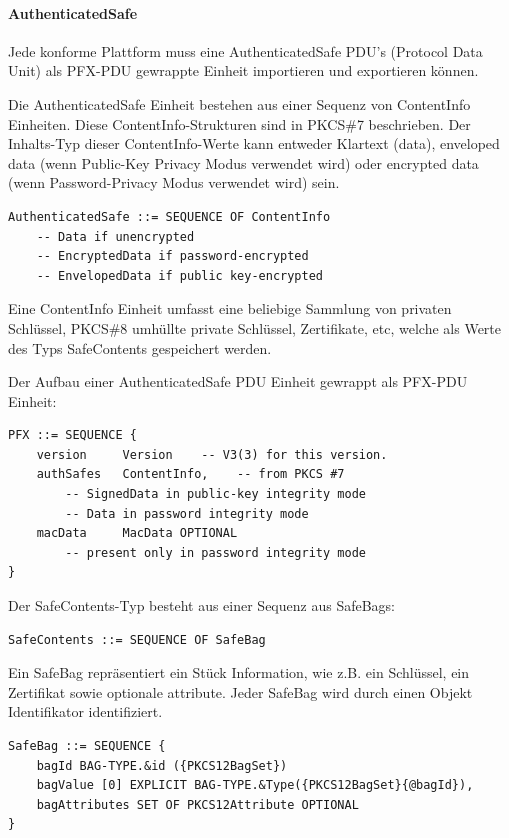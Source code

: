\documentclass[10pt,a4paper]{article}
\begin{document}
\paragraph{AuthenticatedSafe}
Jede konforme Plattform muss eine AuthenticatedSafe PDU’s (Protocol Data Unit) als PFX-PDU
gewrappte Einheit importieren und exportieren können. 

Die AuthenticatedSafe Einheit bestehen aus einer Sequenz von ContentInfo Einheiten. Diese
ContentInfo-Strukturen sind in PKCS\#7 beschrieben. Der Inhalts-Typ dieser
ContentInfo-Werte kann entweder Klartext (data), enveloped data (wenn Public-Key Privacy
Modus verwendet wird) oder encrypted data (wenn Password-Privacy Modus verwendet wird)
sein.

\begin{verbatim}
AuthenticatedSafe ::= SEQUENCE OF ContentInfo
    -- Data if unencrypted
    -- EncryptedData if password-encrypted
    -- EnvelopedData if public key-encrypted 
\end{verbatim}
Eine ContentInfo Einheit umfasst eine beliebige Sammlung von privaten Schlüssel, PKCS\#8
umhüllte private Schlüssel, Zertifikate, etc, welche als Werte des Typs SafeContents
gespeichert werden.

Der Aufbau einer AuthenticatedSafe PDU Einheit gewrappt als PFX-PDU Einheit:

\begin{verbatim}
PFX ::= SEQUENCE {
    version     Version    -- V3(3) for this version.
    authSafes   ContentInfo,    -- from PKCS #7 
        -- SignedData in public-key integrity mode
        -- Data in password integrity mode
    macData     MacData OPTIONAL
        -- present only in password integrity mode
}
\end{verbatim}

Der SafeContents-Typ besteht aus einer Sequenz aus SafeBags:

\begin{verbatim}
SafeContents ::= SEQUENCE OF SafeBag
\end{verbatim}

Ein SafeBag repräsentiert ein Stück Information, wie z.B. ein Schlüssel, ein Zertifikat
sowie optionale attribute. Jeder SafeBag wird durch einen Objekt Identifikator
identifiziert.

\begin{verbatim}
SafeBag ::= SEQUENCE {
    bagId BAG-TYPE.&id ({PKCS12BagSet})
    bagValue [0] EXPLICIT BAG-TYPE.&Type({PKCS12BagSet}{@bagId}),
    bagAttributes SET OF PKCS12Attribute OPTIONAL
}
\end{verbatim}
\end{document}
